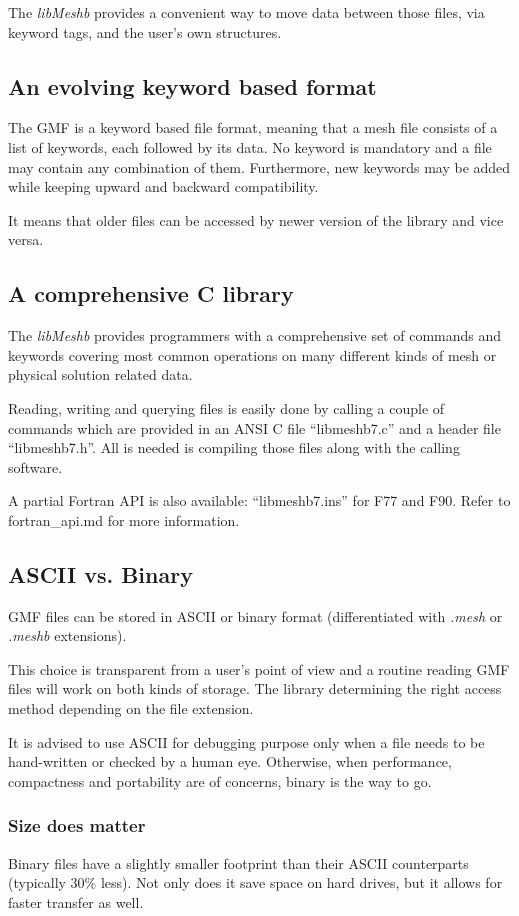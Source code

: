 \documentclass[a4paper,12pt]{article}
\begin{document}
The \emph{libMeshb} provides a convenient way to move data between those files, via keyword tags, and the user's own structures.


\subsection{An evolving keyword based format}
The GMF is a keyword based file format, meaning that a mesh file consists of a list of keywords, each followed by its data. No keyword is mandatory and a file may contain any combination of them. Furthermore, new keywords may be added while keeping upward and backward compatibility.

It means that older files can be accessed by newer version of the library and vice versa.


\subsection{A comprehensive C library}
The \emph{libMeshb} provides programmers with a comprehensive set of commands and keywords covering most common operations on many different kinds of mesh or physical solution related data.

Reading, writing and querying files is easily done by calling a couple of commands which are provided in an ANSI C file ``libmeshb7.c'' and a header file ``libmeshb7.h''. All is needed is compiling those files along with the calling software.

A partial Fortran API is also available: ``libmeshb7.ins'' for F77 and F90. Refer to fortran\_api.md for more information.


\subsection{ASCII vs. Binary}
GMF files can be stored in ASCII or binary format (differentiated with \emph{.mesh} or \emph{.meshb} extensions).

This choice is transparent from a user's point of view and a routine reading GMF files will work on both kinds of storage.
The library determining the right access method depending on the file extension.

It is advised to use ASCII for debugging purpose only when a file needs to be hand-written or checked by a human eye. Otherwise, when performance, compactness and portability are of concerns, binary is the way to go.


\subsubsection{Size does matter}
Binary files have a slightly smaller footprint than their ASCII counterparts (typically 30\% less). Not only does it save space on hard drives, but it allows for faster transfer as well.
\end{document}
